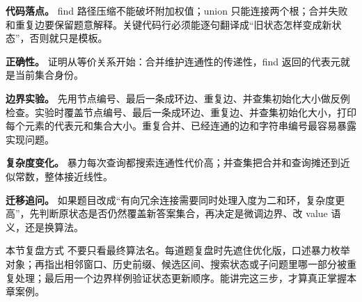 \textbf{代码落点。} find 路径压缩不能破坏附加权值；union 只能连接两个根；合并失败和重复边要保留题意解释。关键代码行必须能逐句翻译成“旧状态怎样变成新状态”，否则就只是模板。

\textbf{正确性。} 证明从等价关系开始：合并维护连通性的传递性，find 返回的代表元就是当前集合身份。

\textbf{边界实验。} 先用节点编号、最后一条成环边、重复边、并查集初始化大小做反例检查。实验时覆盖节点编号、最后一条成环边、重复边、并查集初始化大小，打印每个元素的代表元和集合大小。重复合并、已经连通的边和字符串编号最容易暴露实现问题。

\textbf{复杂度变化。} 暴力每次查询都搜索连通性代价高；并查集把合并和查询摊还到近似常数，整体接近线性。

\textbf{迁移追问。} 如果题目改成“有向冗余连接需要同时处理入度为二和环，复杂度更高”，先判断原状态是否仍然覆盖新答案集合，再决定是微调边界、改 value 语义，还是换算法。

\begin{principlebox}{本节复盘方式}
不要只看最终算法名。每道题复盘时先遮住优化版，口述暴力枚举对象；再指出相邻窗口、历史前缀、候选区间、搜索状态或子问题里哪一部分被重复处理；最后用一个边界样例验证状态更新顺序。能讲完这三步，才算真正掌握本章案例。
\end{principlebox}
